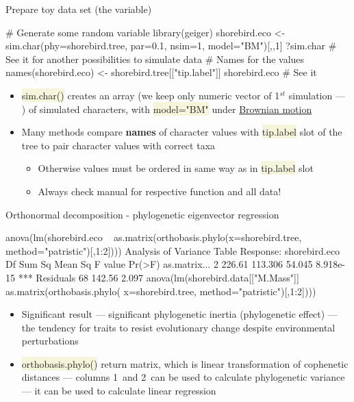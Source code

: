 \documentclass[compress, ucs, xelatex, 11pt, xcolor=svgnames, aspectratio=169,
	hyperref={
		bookmarks=true,
		unicode=true,
		colorlinks=true,
		pdftitle={Molecular data in R},
		plainpages=false,
		pdfauthor={Vojtech Zeisek},
		pdfsubject={Course about phylogeny and evolution in R},
		pdfcreator={XeLaTeX},
		pdfkeywords={R, evolution, phylogeny, molecular data},
		linkcolor=Crimson, %
		anchorcolor=Magenta, %
		citecolor=Magenta, %
		filecolor=Magenta, %
		menucolor=Magenta, %
		urlcolor=DodgerBlue, %
		pdftex},
	url={hyphens, lowtilde} %
	]{beamer}
\renewcommand{\texttt}[1]{\colorbox{Beige}{{\ttfamily #1}}}
\begin{document}
\begin{frame}[fragile]{Prepare toy data set (the variable)}
	\begin{spluscode}
    # Generate some random variable
    library(geiger)
    shorebird.eco <- sim.char(phy=shorebird.tree, par=0.1, nsim=1,
      model="BM")[,,1]
    ?sim.char # See it for another possibilities to simulate data
    # Names for the values
    names(shorebird.eco) <- shorebird.tree[["tip.label"]]
    shorebird.eco # See it
	\end{spluscode}
	\begin{itemize}
		\item \texttt{sim.char()} creates an array (we keep only numeric vector of 1$^{st}$ simulation --- \texttt{[,,1]}) of simulated characters, with \texttt{model="BM"} under \href{https://en.wikipedia.org/wiki/Brownian_motion}{Brownian motion}
		\item Many methods compare \textbf{names} of character values with \texttt{tip.label} slot of the tree to pair character values with correct taxa
		\begin{itemize}
			\item Otherwise values must be ordered in same way as in \texttt{tip.label} slot
			\item \alert{Always check manual for respective function and all data!}
		\end{itemize}
	\end{itemize}
\end{frame}

\begin{frame}[fragile]{Orthonormal decomposition - phylogenetic eigenvector regression}
	\begin{spluscode}
    anova(lm(shorebird.eco ~ as.matrix(orthobasis.phylo(x=shorebird.tree,
      method="patristic")[,1:2])))
    Analysis of Variance Table
    Response: shorebird.eco
                 Df Sum Sq Mean Sq F value    Pr(>F)
    as.matrix...  2 226.61 113.306  54.045 8.918e-15 ***
    Residuals    68 142.56   2.097
    anova(lm(shorebird.data[["M.Mass"]] ~ as.matrix(orthobasis.phylo(
      x=shorebird.tree, method="patristic")[,1:2])))
	\end{spluscode}
	\begin{itemize}
		\item Significant result --- significant phylogenetic inertia (phylogenetic effect) --- the tendency for traits to resist evolutionary change despite environmental perturbations
		\item \texttt{orthobasis.phylo()} return matrix, which is linear transformation of cophenetic distances --- columns 1~and 2~can be used to calculate phylogenetic variance --- it can be used to calculate linear regression
	\end{itemize}
\end{frame}
\end{document}
